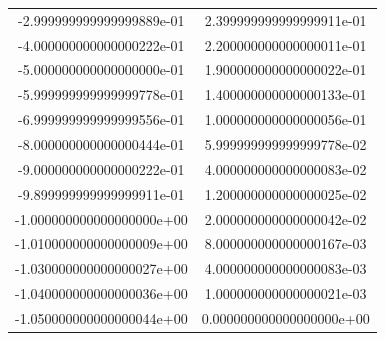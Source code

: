 \begin{table}
\begin{tabular}{S[round-precision = 1]|S[round-precision = 1]}
    -2.999999999999999889e-01 & 2.399999999999999911e-01\\
    -4.000000000000000222e-01 & 2.200000000000000011e-01\\
    -5.000000000000000000e-01 & 1.900000000000000022e-01\\
    -5.999999999999999778e-01 & 1.400000000000000133e-01\\
    -6.999999999999999556e-01 & 1.000000000000000056e-01\\
    -8.000000000000000444e-01 & 5.999999999999999778e-02\\
    -9.000000000000000222e-01 & 4.000000000000000083e-02\\
    -9.899999999999999911e-01 & 1.200000000000000025e-02\\
    -1.000000000000000000e+00 & 2.000000000000000042e-02\\
    -1.010000000000000009e+00 & 8.000000000000000167e-03\\
    -1.030000000000000027e+00 & 4.000000000000000083e-03\\
    -1.040000000000000036e+00 & 1.000000000000000021e-03\\
    -1.050000000000000044e+00 & 0.000000000000000000e+00\\
    \bottomrule
  \end{tabular}
\end{table}
